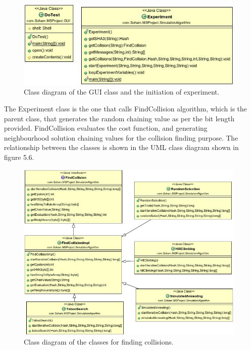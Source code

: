 \begin{figure}
  \begin{center}
    \includegraphics[width=5.65in]{ExperimentGUIClass.jpg}
  \end{center}
  \caption{Class diagram of the GUI class and the initiation of experiment.}
  \label{fig:UMLExperimentGUIClass}
\end{figure}

The Experiment class is the one that calls FindCollision algorithm, which is the parent class, that generates
the random chaining value as per the bit length provided. FindCollision evaluates the cost function, and generating
neighbourhood solution chaining values for the collision finding purpose. The relationship between the classes 
is shown in the UML class diagram shown in figure 5.6.

\begin{figure}
  \begin{center}
    \includegraphics[width=7in]{FindCollisionClasses.jpg}
  \end{center}
  \caption{Class diagram of the classes for finding collisions.}
  \label{fig:UMLCollisionFindingClasses}
\end{figure}

